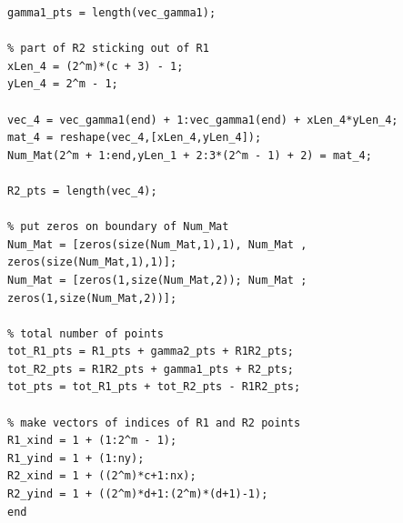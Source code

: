 \documentclass[12pt]{article}
\begin{document}
\begin{lstlisting}[caption=Enumeration for b equals 2]
gamma1_pts = length(vec_gamma1);

% part of R2 sticking out of R1
xLen_4 = (2^m)*(c + 3) - 1;
yLen_4 = 2^m - 1;

vec_4 = vec_gamma1(end) + 1:vec_gamma1(end) + xLen_4*yLen_4;
mat_4 = reshape(vec_4,[xLen_4,yLen_4]);
Num_Mat(2^m + 1:end,yLen_1 + 2:3*(2^m - 1) + 2) = mat_4;

R2_pts = length(vec_4);

% put zeros on boundary of Num_Mat
Num_Mat = [zeros(size(Num_Mat,1),1), Num_Mat , zeros(size(Num_Mat,1),1)];
Num_Mat = [zeros(1,size(Num_Mat,2)); Num_Mat ; zeros(1,size(Num_Mat,2))];

% total number of points
tot_R1_pts = R1_pts + gamma2_pts + R1R2_pts;
tot_R2_pts = R1R2_pts + gamma1_pts + R2_pts;
tot_pts = tot_R1_pts + tot_R2_pts - R1R2_pts;

% make vectors of indices of R1 and R2 points
R1_xind = 1 + (1:2^m - 1);
R1_yind = 1 + (1:ny);
R2_xind = 1 + ((2^m)*c+1:nx);
R2_yind = 1 + ((2^m)*d+1:(2^m)*(d+1)-1);
end
\end{lstlisting}
\end{document}
